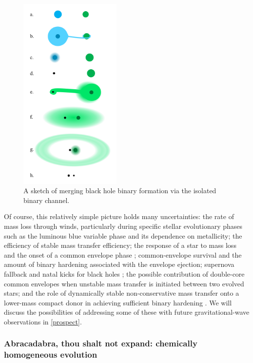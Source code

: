 \documentclass[iop,onecolumn]{revtex4}
\begin{document}
\begin{figure}
	\centering
	\includegraphics[width=0.45\textwidth]{channel1.png}
	\caption{\label{fig:isol_binary} A sketch of merging black hole binary formation via the isolated binary channel.}
\end{figure}

Of course, this relatively simple picture holds many uncertainties: the rate of mass loss through winds, particularly during specific stellar evolutionary phases such as the luminous blue variable phase \citep{Mennekens:2014} and its dependence on metallicity; the efficiency of stable mass transfer efficiency; the response of a star to mass loss and the onset of a common envelope phase \citep{Pavlovskii:2017}; common-envelope survival and the amount of binary hardening associated with the envelope ejection; supernova fallback and natal kicks for black holes \citep[e.g.,][]{Repetto:2012,Mandel:2015kicks}; the possible contribution of double-core common envelopes when unstable mass transfer is initiated between two evolved stars; and the role of dynamically stable non-conservative mass transfer onto a lower-mass compact donor in achieving sufficient binary hardening  \citep{vandenHeuvel:2017,Neijssel:2018}.  We will discuss the possibilities of addressing some of these with future gravitational-wave observations in \autoref{prospect}.

\subsubsection{Abracadabra, thou shalt not expand: chemically homogeneous evolution}
\end{document}
